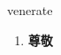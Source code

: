 
\begin{frame}
{\huge venerate}
\begin{center}
\begin{enumerate}\Large
  \item \textbf{尊敬}
\end{enumerate}
\end{center}
\end{frame}
